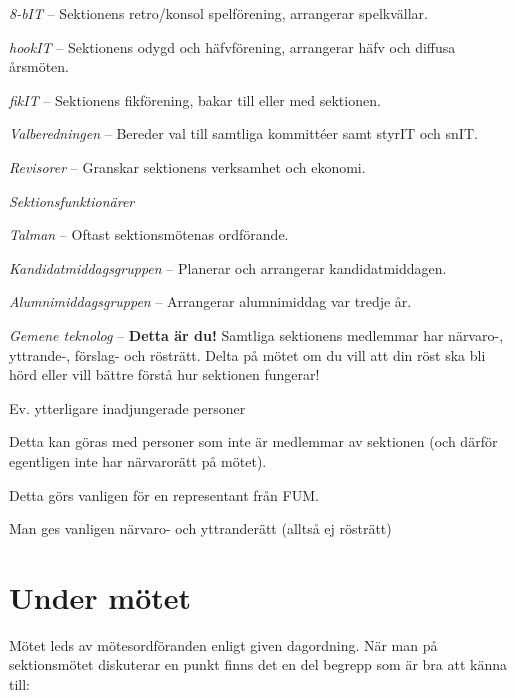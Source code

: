 \documentclass[11pt, noincludeaddress]{classes/cthit}
\let\tempone\itemize
\let\temptwo\enditemize
\renewenvironment{itemize}{\tempone\addtolength{\itemsep}{-0.3\baselineskip}}{\temptwo}
\begin{document}
\begin{itemize}
\begin{itemize}
        \item \textit{8-bIT} -- Sektionens retro/konsol spelförening, arrangerar spelkvällar.
        \item \textit{hookIT} -- Sektionens odygd och häfvförening, arrangerar häfv och diffusa årsmöten.
        \item \textit{fikIT} -- Sektionens fikförening, bakar till eller med sektionen.
    \end{itemize}
    \item \textit{Valberedningen} -- Bereder val till samtliga kommittéer samt styrIT och snIT.
    \item \textit{Revisorer} -- Granskar sektionens verksamhet och ekonomi.
    \item \textit{Sektionsfunktionärer}
    \begin{itemize}
        \item \textit{Talman} -- Oftast sektionsmötenas ordförande.
        \item \textit{Kandidatmiddagsgruppen} -- Planerar och arrangerar kandidatmiddagen.
        \item \textit{Alumnimiddagsgruppen} -- Arrangerar alumnimiddag var tredje år.
    \end{itemize}
    \item \textit{Gemene teknolog} -- \textbf{Detta är du!} Samtliga sektionens medlemmar har närvaro-, yttrande-, förslag- och rösträtt. Delta på mötet om du vill att din röst ska bli hörd eller vill bättre förstå hur sektionen fungerar!
    \item Ev. ytterligare inadjungerade personer
    \begin{itemize}
        \item Detta kan göras med personer som inte är medlemmar av sektionen (och därför egentligen inte har närvarorätt på mötet).
        \item Detta görs vanligen för en representant från FUM.
        \item Man ges vanligen närvaro- och yttranderätt (alltså ej rösträtt)
    \end{itemize}
\end{itemize}

\section{Under mötet}
Mötet leds av mötesordföranden enligt given dagordning. När man på sektionsmötet diskuterar en punkt finns det en del begrepp som är bra att känna till:
\end{document}
